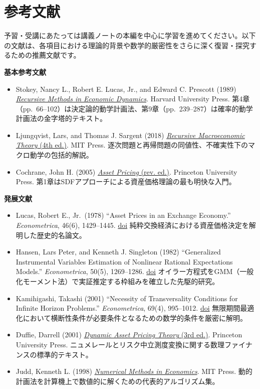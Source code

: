 \documentclass[
  japanese,
  lualatex,
  ja=standard,
  12pt,
  a4paper]{ltjsarticle}
\providecommand{\tightlist}{%
  \setlength{\itemsep}{0pt}\setlength{\parskip}{0pt}}
\begin{document}
\section{参考文献}\label{ux53c2ux8003ux6587ux732e}

予習・受講にあたっては講義ノートの本編を中心に学習を進めてください。以下の文献は、各項目における理論的背景や数学的厳密性をさらに深く復習・探究するための推薦文献です。

\textbf{基本参考文献}

\begin{itemize}
\tightlist
\item
  Stokey, Nancy L., Robert E. Lucas, Jr., and Edward C. Prescott (1989)
  \href{https://www.jstor.org/stable/j.ctvjnrt76}{\emph{Recursive
  Methods in Economic Dynamics}}. Harvard University Press.
  第4章（pp.~66--102）は決定論的動学計画法、第9章（pp.~239--287）は確率的動学計画法の金字塔的テキスト。
\item
  Ljungqvist, Lars, and Thomas J. Sargent (2018)
  \href{https://mitpress.mit.edu/9780262038669/recursive-macroeconomic-theory/}{\emph{Recursive
  Macroeconomic Theory} (4th ed.)}. MIT Press.
  逐次問題と再帰問題の同値性、不確実性下のマクロ動学の包括的解説。
\item
  Cochrane, John H. (2005)
  \href{https://www.johnhcochrane.com/asset-pricing}{\emph{Asset
  Pricing} (rev. ed.)}. Princeton University Press.
  第1章はSDFアプローチによる資産価格理論の最も明快な入門。
\end{itemize}

\textbf{発展文献}

\begin{itemize}
\tightlist
\item
  Lucas, Robert E., Jr.~(1978) ``Asset Prices in an Exchange Economy.''
  \emph{Econometrica}, 46(6), 1429--1445.
  \href{https://doi.org/10.2307/1913837}{doi}
  純粋交換経済における資産価格決定を解明した歴史的名論文。
\item
  Hansen, Lars Peter, and Kenneth J. Singleton (1982) ``Generalized
  Instrumental Variables Estimation of Nonlinear Rational Expectations
  Models.'' \emph{Econometrica}, 50(5), 1269--1286.
  \href{https://doi.org/10.2307/1911873}{doi}
  オイラー方程式をGMM（一般化モーメント法）で実証推定する枠組みを確立した先駆的研究。
\item
  Kamihigashi, Takashi (2001) ``Necessity of Transversality Conditions
  for Infinite Horizon Problems.'' \emph{Econometrica}, 69(4),
  995--1012. \href{https://doi.org/10.1111/1468-0262.00227}{doi}
  無限期間最適化において横断性条件が必要条件となるための数学的条件を厳密に解明。
\item
  Duffie, Darrell (2001)
  \href{https://www.gsb.stanford.edu/faculty-research/books/dynamic-asset-pricing-theory}{\emph{Dynamic
  Asset Pricing Theory} (3rd ed.)}. Princeton University Press.
  ニュメレールとリスク中立測度変換に関する数理ファイナンスの標準的テキスト。
\item
  Judd, Kenneth L. (1998)
  \href{https://mitpress.mit.edu/9780262547741/numerical-methods-in-economics/}{\emph{Numerical
  Methods in Economics}}. MIT Press.
  動的計画法を計算機上で数値的に解くための代表的アルゴリズム集。
\end{itemize}
\end{document}
